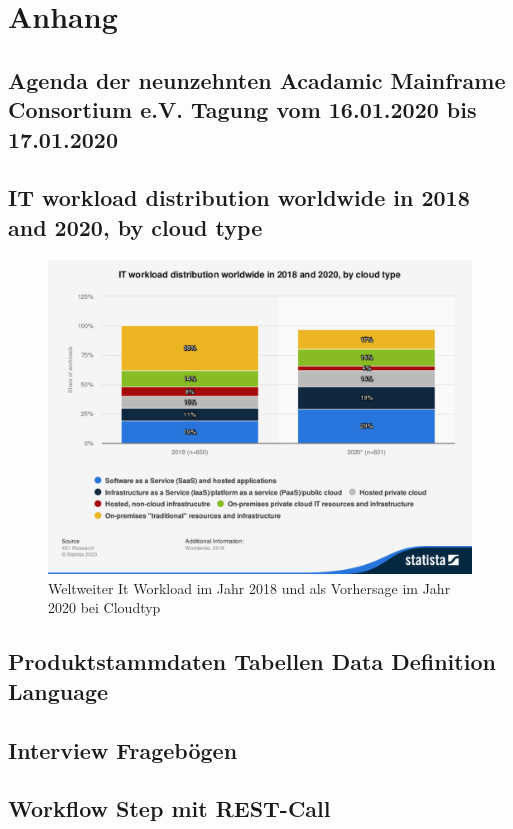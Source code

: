 \chapter{Anhang}\label{app:Anhang}

\section{Agenda der neunzehnten Acadamic Mainframe Consortium e.V. Tagung vom 16.01.2020 bis 17.01.2020}\label{app:AMC}


\section{IT workload distribution worldwide in 2018 and 2020, by cloud type}
\begin{figure}[ht!]
\centering
\includegraphics[width=\textwidth]{figures/statistic_id748238_it-workload-distribution-globally-2018-and-2020-by-cloud-type.pdf}
\caption{Weltweiter It Workload im Jahr 2018 und als Vorhersage im Jahr 2020 bei Cloudtyp }
\label{app:itworkload}
\end{figure}


\section{Produktstammdaten Tabellen Data Definition Language}\label{app:ddl}

\pagebreak
\section{Interview Fragebögen}\label{app:fragen}










\section{Workflow Step mit REST-Call}\label{app:db2prov}
